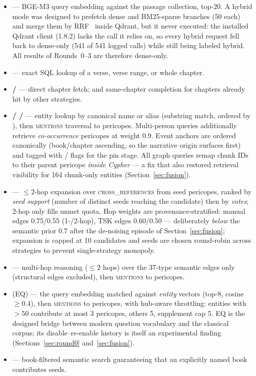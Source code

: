 \begin{itemize}
\item \textbf{} --- BGE-M3 query embedding against the
passage collection, top-20. A hybrid mode was designed to prefetch dense
and BM25-sparse branches (50 each) and merge them by
RRF~\cite{cormack2009rrf} inside Qdrant, but it never executed: the
installed Qdrant client (1.8.2) lacks the  call it
relies on, so every hybrid request fell back to dense-only (541 of 541
logged calls) while still being labeled hybrid. All results of
Rounds~0--3 are therefore dense-only.
\item \textbf{} --- exact SQL lookup of a verse,
verse range, or whole chapter.
\item \textbf{ / } --- direct
chapter fetch; and same-chapter completion for chapters already hit by
other strategies.
\item \textbf{ /  /
} --- entity lookup by canonical name or alias
(substring match, ordered by ), then
\textsc{mentions} traversal to pericopes. Multi-person queries
additionally retrieve \emph{co-occurrence} pericopes at weight 0.9.
Event anchors are ordered canonically (book/chapter ascending, so the
narrative origin surfaces first) and tagged with
/ flags for the pin stage. All
graph queries remap chunk IDs to their parent pericope \emph{inside
Cypher} --- a fix that also restored retrieval visibility for 164
chunk-only entities (Section~\ref{sec:fusion}).
\item \textbf{} --- $\le 2$-hop expansion over
\textsc{cross\_references} from seed pericopes, ranked by
\emph{seed support} (number of distinct seeds reaching the candidate)
then by \emph{votes}; 2-hop only fills unmet quota. Hop weights are
provenance-stratified: manual edges 0.75/0.55 (1-/2-hop), TSK edges
0.60/0.50 --- deliberately \emph{below} the semantic prior 0.7 after the
de-noising episode of Section~\ref{sec:fusion}; expansion is capped at
10 candidates and seeds are chosen round-robin across strategies to
prevent single-strategy monopoly.
\item \textbf{} --- multi-hop reasoning ($\le 2$ hops)
over the 37-type semantic edges only (structural edges excluded), then
\textsc{mentions} to pericopes.
\item \textbf{} (EQ) --- the query embedding matched
against \emph{entity} vectors (top-8, cosine $\ge 0.4$), then
\textsc{mentions} to pericopes, with hub-aware throttling: entities with
 $> 50$ contribute at most 3 pericopes, others 5,
supplement cap 5. EQ is the designed bridge between modern question
vocabulary and the classical corpus; its disable--re-enable history is
itself an experimental finding (Sections~\ref{sec:round0}
and~\ref{sec:fusion}).
\item \textbf{} --- book-filtered semantic search
guaranteeing that an explicitly named book contributes seeds.
\end{itemize}

